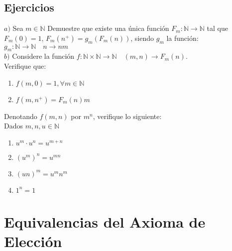 \subsection{Ejercicios}
\begin{problem}
    
    $a)$ Sea $m \in \mathbb{N}$ Demuestre que existe una única función $F_m:
    \mathbb{N} \rightarrow \mathbb{N}$ tal que $F_m(0) = 1$, $F_m(n^+) =
    g_m(F_m(n))$, siendo $g_m$ la función: $g_m: \mathbb{N} \rightarrow
    \mathbb{N}\quad n \rightarrow nm$ \\
    $b)$ Considere la función $f: \mathbb{N}\times \mathbb{N} \rightarrow
    \mathbb{N}\quad (m,n) \rightarrow F_m(n)$. \\
    Verifique que:
    \begin{enumerate}
        \item $f(m,0) =1, \forall m \in \mathbb{N}$ 
        \item $f(m,n^+) = F_m(n)m$
    \end{enumerate}
    Denotando $f(m,n)$ por $m^n$, verifique lo siguiente: \\
    Dados $m,n, u \in \mathbb{N}$
    \begin{enumerate}
        \item $u^m \cdot u^n = u ^{m+n}$
        \item $(u^m)^n = u^{mn}$
        \item $(un)^m = u^mn^m$
        \item $1^n = 1$
    \end{enumerate}
\end{problem}
    \section{Equivalencias del Axioma de Elección}
    




